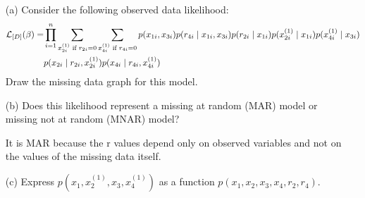 \documentclass[11pt]{article}
\renewcommand{\vec}[1]{\mathbf{#1}}
\begin{document}
\begin{enumerate}
\item[(a)] Consider the following observed data likelihood:
{\small
\begin{align*}
{\cal L}_{[D]}(\vec{\beta}) =& \prod_{i=1}^n \sum_{x^{(1)}_{2i} \text{ if }r_{2i}=0} \sum_{x^{(1)}_{4i} \text{ if }r_{4i}=0}  p(x_{1i}, x_{3i}) p(r_{4i} \mid x_{1i}, x_{3i}) p(r_{2i} \mid x_{1i})
p(x^{(1)}_{2i} \mid x_{1i})
p(x^{(1)}_{4i} \mid x_{3i}) \\
& 
p(x_{2i} \mid r_{2i}, x^{(1)}_{2i})
p(x_{4i} \mid r_{4i}, x^{(1)}_{4i})
\end{align*}
}
Draw the missing data graph for this model.

\begin{answertext}{6cm}{}

    
\end{answertext}
\item[(b)] Does this likelihood represent a missing at random (MAR) model or missing not at random (MNAR) model?

\begin{answertext}{1.5cm}{}

It is MAR because the r values depend only on observed variables and not on the values of the missing data itself. 
    
\end{answertext}
\item[(c)] Express $p(x_1, x_2^{(1)}, x_3, x_4^{(1)})$ as a function $p(x_1, x_2, x_3, x_4, r_2, r_4)$.



\end{enumerate}
\end{document}
